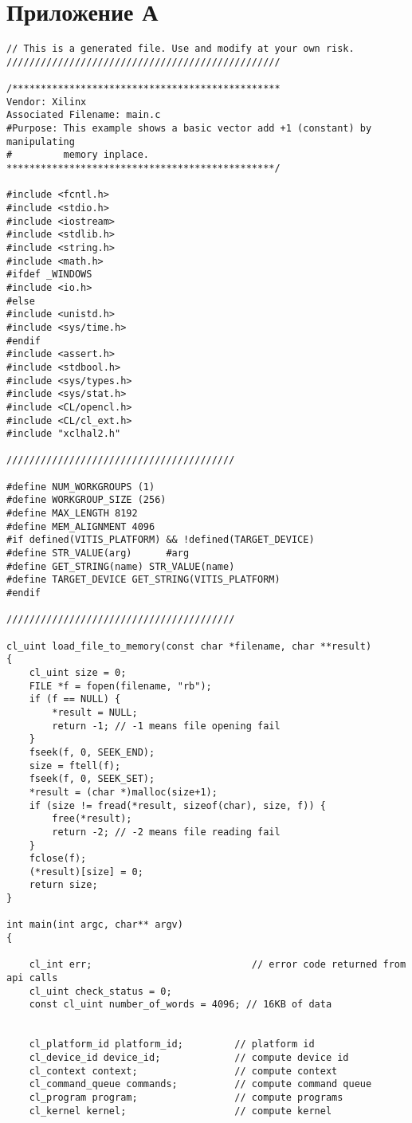 \chapter*{Приложение А}

\begin{lstlisting}[label=lst:code_1,caption=Содержимое файла host\_example.cpp]
// This is a generated file. Use and modify at your own risk.
////////////////////////////////////////////////

/***********************************************
Vendor: Xilinx
Associated Filename: main.c
#Purpose: This example shows a basic vector add +1 (constant) by manipulating
#         memory inplace.
***********************************************/

#include <fcntl.h>
#include <stdio.h>
#include <iostream>
#include <stdlib.h>
#include <string.h>
#include <math.h>
#ifdef _WINDOWS
#include <io.h>
#else
#include <unistd.h>
#include <sys/time.h>
#endif
#include <assert.h>
#include <stdbool.h>
#include <sys/types.h>
#include <sys/stat.h>
#include <CL/opencl.h>
#include <CL/cl_ext.h>
#include "xclhal2.h"

////////////////////////////////////////

#define NUM_WORKGROUPS (1)
#define WORKGROUP_SIZE (256)
#define MAX_LENGTH 8192
#define MEM_ALIGNMENT 4096
#if defined(VITIS_PLATFORM) && !defined(TARGET_DEVICE)
#define STR_VALUE(arg)      #arg
#define GET_STRING(name) STR_VALUE(name)
#define TARGET_DEVICE GET_STRING(VITIS_PLATFORM)
#endif

////////////////////////////////////////

cl_uint load_file_to_memory(const char *filename, char **result)
{
	cl_uint size = 0;
	FILE *f = fopen(filename, "rb");
	if (f == NULL) {
		*result = NULL;
		return -1; // -1 means file opening fail
	}
	fseek(f, 0, SEEK_END);
	size = ftell(f);
	fseek(f, 0, SEEK_SET);
	*result = (char *)malloc(size+1);
	if (size != fread(*result, sizeof(char), size, f)) {
		free(*result);
		return -2; // -2 means file reading fail
	}
	fclose(f);
	(*result)[size] = 0;
	return size;
}

int main(int argc, char** argv)
{
	
	cl_int err;                            // error code returned from api calls
	cl_uint check_status = 0;
	const cl_uint number_of_words = 4096; // 16KB of data
	
	
	cl_platform_id platform_id;         // platform id
	cl_device_id device_id;             // compute device id
	cl_context context;                 // compute context
	cl_command_queue commands;          // compute command queue
	cl_program program;                 // compute programs
	cl_kernel kernel;                   // compute kernel
	

\end{lstlisting}
